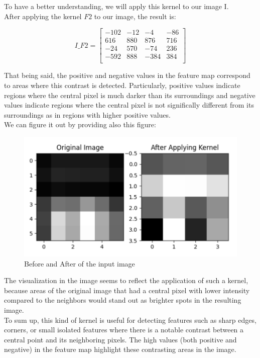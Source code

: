 \begin{itemize}
	To have a better understanding, we will apply this kernel to our image I.\\
	After applying the kernel $F2$ to our image, the result is:
	
		\begin{equation}
		I\_F2 = \begin{bmatrix}
			-102 & -12 &  -4 & -86 \\
			 616  & 880 &  876 &  716  \\
			-24 & 570 & -74 & 236   \\
			-592 & 888 & -384 & 384 \\
		\end{bmatrix}
	\end{equation}
	\vspace{2mm}
	
	That being said, the positive and negative values in the feature map correspond to areas where this contrast is detected. Particularly, positive values indicate regions where the central pixel is much darker than its surroundings and negative values indicate regions where the central pixel is not significally different from its surroundings as in regions with higher positive values.\\
	
	We can figure it out by providing also this figure:
	\begin{figure}[H]
		\centering
		\includegraphics[width=.7\textwidth]{../Problem 11/kernel_F2.pdf}
		\caption{Before and After of the input image}
		\label{fig:kernel2}
	\end{figure}
	\vspace{3mm}
	
	The visualization in the image seems to reflect the application of such a kernel, because areas of the original image that had a central pixel with lower intensity compared to the neighbors would stand out as brighter spots in the resulting image.\\
	
	To sum up, this kind of kernel is useful for detecting features such as sharp edges, corners, or small isolated features where there is a notable contrast between a central point and its neighboring pixels. The high values (both positive and negative) in the feature map highlight these contrasting areas in the image.
	\vspace{3mm}
	

\end{itemize}
